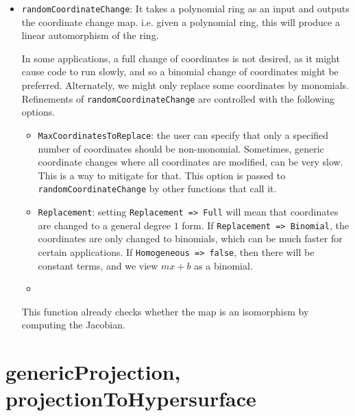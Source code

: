 \documentclass[11pt]{amsart}
\theoremstyle{definition}
\begin{document}
\begin{itemize}
	\item {\tt randomCoordinateChange}: It takes a polynomial ring as an input and outputs the coordinate change map. 
	i.e. given a polynomial ring, this will produce a linear automorphism of the ring. 
	
	In some applications, a full change of coordinates is not desired, as it might cause code to run slowly, and so a binomial change of coordinates might be preferred.  Alternately, we might only replace some coordinates by monomials.  
	Refinements of {\tt randomCoordinateChange} are controlled with the following options.
	
	\begin{itemize}
		\item {\tt MaxCoordinatesToReplace}: the user can specify that only a specified number of coordinates should be non-monomial.  Sometimes, generic coordinate changes where all coordinates are modified, can be very slow.  This is a way to mitigate for that.
		This option is passed to {\tt randomCoordinateChange} by other functions that call it. 		
		\item {\tt Replacement}: setting {\tt Replacement => Full} will mean that coordinates are changed to a general degree $1$ form.  If {\tt Replacement => Binomial}, the coordinates are only changed to binomials, which can be much faster for certain applications. If {\tt Homogeneous => false}, then there will be constant terms, and we view $mx + b$ as a binomial.
		\item 
	\end{itemize} 
	
	  This function already checks whether the map is an isomorphism by computing the Jacobian.
\end{itemize}

\section{genericProjection, projectionToHypersurface}\label{projectionfunctions}
\end{document}
